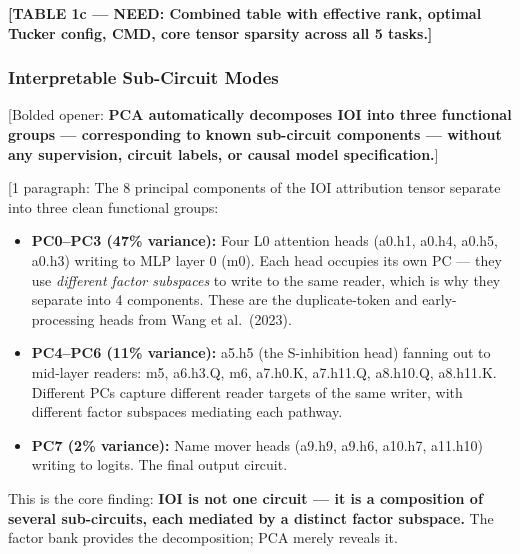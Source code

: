 \documentclass[11pt]{article}
\begin{document}
\textbf{[TABLE 1c --- NEED: Combined table with effective rank, optimal
Tucker config, CMD, core tensor sparsity across all 5 tasks.]}


\subsubsection{Interpretable Sub-Circuit Modes}

[Bolded opener: \textbf{PCA automatically decomposes IOI into three
functional groups --- corresponding to known sub-circuit components ---
without any supervision, circuit labels, or causal model specification.}]

[1 paragraph: The 8 principal components of the IOI attribution tensor
separate into three clean functional groups:
\begin{itemize}
\item \textbf{PC0--PC3 (47\% variance):} Four L0 attention heads
(a0.h1, a0.h4, a0.h5, a0.h3) writing to MLP layer 0 (m0). Each head
occupies its own PC --- they use \emph{different factor subspaces} to
write to the same reader, which is why they separate into 4 components.
These are the duplicate-token and early-processing heads from Wang et al.\ (2023).
\item \textbf{PC4--PC6 (11\% variance):} a5.h5 (the S-inhibition head)
fanning out to mid-layer readers: m5, a6.h3.Q, m6, a7.h0.K, a7.h11.Q,
a8.h10.Q, a8.h11.K. Different PCs capture different reader targets of
the same writer, with different factor subspaces mediating each pathway.
\item \textbf{PC7 (2\% variance):} Name mover heads (a9.h9, a9.h6,
a10.h7, a11.h10) writing to logits. The final output circuit.
\end{itemize}
This is the core finding: \textbf{IOI is not one circuit --- it is a
composition of several sub-circuits, each mediated by a distinct factor
subspace.} The factor bank provides the decomposition; PCA merely
reveals it.

\end{document}
